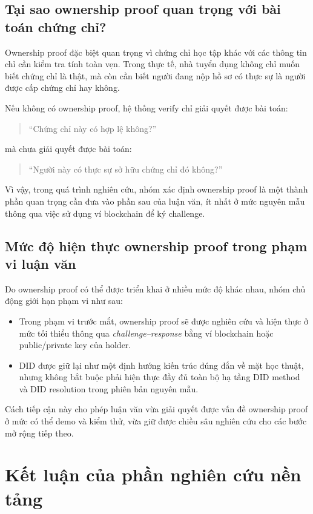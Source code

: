 \subsection{Tại sao ownership proof quan trọng với bài toán chứng chỉ?}

Ownership proof đặc biệt quan trọng vì chứng chỉ học tập khác với các thông tin chỉ cần kiểm tra tính toàn vẹn. Trong thực tế, nhà tuyển dụng không chỉ muốn biết chứng chỉ là thật, mà còn cần biết người đang nộp hồ sơ có thực sự là người được cấp chứng chỉ hay không.

Nếu không có ownership proof, hệ thống verify chỉ giải quyết được bài toán:
\begin{quote}
``Chứng chỉ này có hợp lệ không?''
\end{quote}
mà chưa giải quyết được bài toán:
\begin{quote}
``Người này có thực sự sở hữu chứng chỉ đó không?''
\end{quote}

Vì vậy, trong quá trình nghiên cứu, nhóm xác định ownership proof là một thành phần quan trọng cần đưa vào phần sau của luận văn, ít nhất ở mức nguyên mẫu thông qua việc sử dụng ví blockchain để ký challenge.

\subsection{Mức độ hiện thực ownership proof trong phạm vi luận văn}

Do ownership proof có thể được triển khai ở nhiều mức độ khác nhau, nhóm chủ động giới hạn phạm vi như sau:
\begin{itemize}
    \item Trong phạm vi trước mắt, ownership proof sẽ được nghiên cứu và hiện thực ở mức tối thiểu thông qua \textit{challenge--response} bằng ví blockchain hoặc public/private key của holder.
    \item DID được giữ lại như một định hướng kiến trúc đúng đắn về mặt học thuật, nhưng không bắt buộc phải hiện thực đầy đủ toàn bộ hạ tầng DID method và DID resolution trong phiên bản nguyên mẫu.
\end{itemize}

Cách tiếp cận này cho phép luận văn vừa giải quyết được vấn đề ownership proof ở mức có thể demo và kiểm thử, vừa giữ được chiều sâu nghiên cứu cho các bước mở rộng tiếp theo.

\section{Kết luận của phần nghiên cứu nền tảng}


